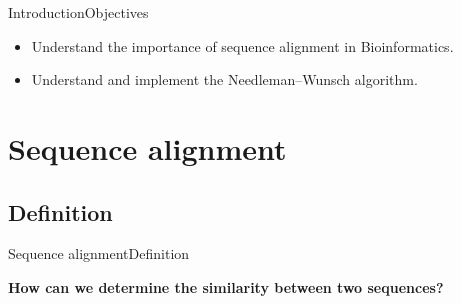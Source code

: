\documentclass[10pt]{beamer}
\newcommand{\1}{
	\setbeamertemplate{background}{
		\texttt{[image: img/1]}
		\tikz[overlay] \fill[fill opacity=0.75,fill=white] (0,0) rectangle (-\paperwidth,\paperheight);
	}
}
\begin{document}
\begin{frame}{Introduction}{Objectives}
\begin{itemize}
    \item<1-> Understand the importance of sequence alignment in Bioinformatics. 
    \item<2-> Understand and implement the Needleman–Wunsch algorithm.
  \end{itemize}
\end{frame}



\section{Sequence alignment}

\subsection{Definition}

\begin{frame}{Sequence alignment}{Definition}

\begin{block}{}
\centering
\textbf{How can we determine the similarity between two sequences?}
\end{block}

\end{frame}
\end{document}
